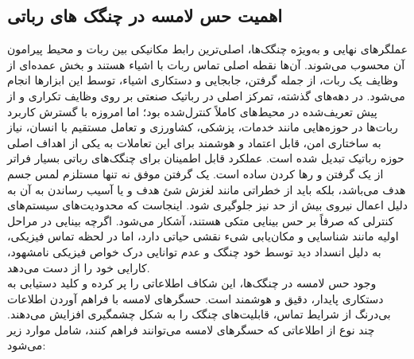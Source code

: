 \subsection{اهمیت حس لامسه در چنگک های رباتی}
عملگرهای نهایی 
و به‌ویژه چنگک‌ها، اصلی‌ترین رابط مکانیکی بین ربات و محیط پیرامون آن محسوب می‌شوند. آن‌ها نقطه اصلی تماس ربات با اشیاء هستند و بخش عمده‌ای از وظایف یک ربات، از جمله گرفتن، جابجایی و دستکاری اشیاء، توسط این ابزارها انجام می‌شود. در دهه‌های گذشته، تمرکز اصلی در رباتیک صنعتی بر روی وظایف تکراری و از پیش تعریف‌‌شده در محیط‌های کاملاً کنترل‌شده بود؛ اما امروزه با گسترش کاربرد ربات‌ها در حوزه‌هایی مانند خدمات، پزشکی، کشاورزی و تعامل مستقیم با انسان، نیاز به ساختاری امن، قابل اعتماد و هوشمند برای این تعاملات به یکی از اهداف اصلی حوزه رباتیک تبدیل شده است.
\cite{broadbent2017interactions}
عملکرد قابل اطمینان برای چنگک‌های رباتی بسیار فراتر از یک گرفتن و رها کردن ساده است. یک گرفتن موفق نه تنها مستلزم لمس جسم هدف می‌باشد، بلکه باید از خطراتی مانند لغزش
  شئ هدف و یا آسیب رساندن به آن به دلیل اعمال نیروی بیش از حد نیز جلوگیری شود. اینجاست که محدودیت‌های سیستم‌های کنترلی که صرفاً بر حس بینایی متکی هستند، آشکار می‌شود. اگرچه بینایی در مراحل اولیه مانند شناسایی و مکان‌یابی شیء نقشی حیاتی دارد، اما در لحظه تماس فیزیکی، به دلیل انسداد دید توسط خود چنگک و عدم توانایی درک خواص فیزیکی نامشهود، کارایی خود را از دست می‌دهد.
 \cite{malis2002survey}
 \\
 وجود حس لامسه در چنگک‌ها، این شکاف اطلاعاتی را پر کرده و کلید دستیابی به دستکاری 
 پایدار، دقیق و هوشمند است. حسگرهای لامسه با فراهم آوردن اطلاعات بی‌درنگ از شرایط تماس، قابلیت‌های چنگک را به شکل چشمگیری افزایش می‌دهند. چند نوع از اطلاعاتی که حسگرهای لامسه می‌توانند فراهم کنند، شامل موارد زیر می‌شود:
